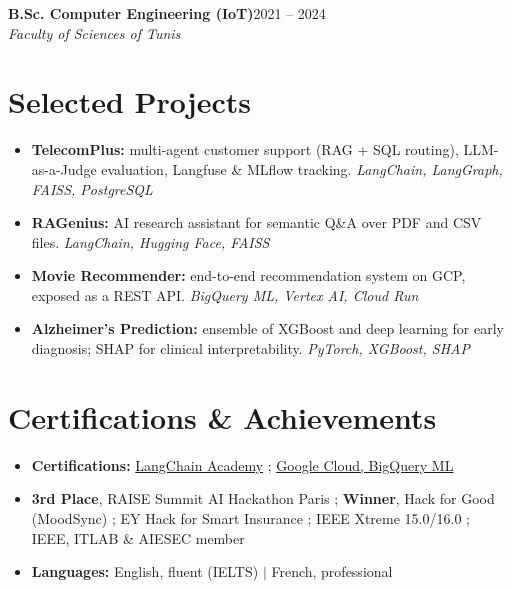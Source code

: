 \documentclass[9.5pt,a4paper]{article}
\newcommand{\jobtitle}[3]{\textbf{#1}\hfill{\small #2}\\[1pt]\textit{#3}}
\begin{document}
\vspace{1.8mm}
\jobtitle{B.Sc. Computer Engineering (IoT)}{2021 -- 2024}{Faculty of Sciences of Tunis}

\section*{Selected Projects}
\begin{itemize}
\item \textbf{TelecomPlus:} multi-agent customer support (RAG + SQL routing), LLM-as-a-Judge evaluation, Langfuse \& MLflow tracking. \textit{LangChain, LangGraph, FAISS, PostgreSQL}
\item \textbf{RAGenius:} AI research assistant for semantic Q\&A over PDF and CSV files. \textit{LangChain, Hugging Face, FAISS}
\item \textbf{Movie Recommender:} end-to-end recommendation system on GCP, exposed as a REST API. \textit{BigQuery ML, Vertex AI, Cloud Run}
\item \textbf{Alzheimer's Prediction:} ensemble of XGBoost and deep learning for early diagnosis; SHAP for clinical interpretability. \textit{PyTorch, XGBoost, SHAP}
\end{itemize}

\section*{Certifications \& Achievements}
\begin{itemize}
\item \textbf{Certifications:} \href{https://academy.langchain.com/certificates/nqrsewnhol}{LangChain Academy} ; \href{https://www.credly.com/badges/9ec1dc8b-494f-42ee-a314-ba30b40342de/public_url}{Google Cloud, BigQuery ML}
\item \textbf{3rd Place}, RAISE Summit AI Hackathon Paris ; \textbf{Winner}, Hack for Good (MoodSync) ; EY Hack for Smart Insurance ; IEEE Xtreme 15.0/16.0 ; IEEE, ITLAB \& AIESEC member
\item \textbf{Languages:} English, fluent (IELTS) $\vert$ French, professional
\end{itemize}
\end{document}
